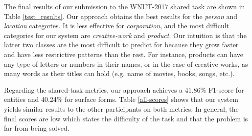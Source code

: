\documentclass[11pt,letterpaper]{article}
\begin{document}
\begin{table}
\caption{\small \label{test_results} This table shows the final results of our submission. The hardest class to predict for is \textit{creative-work}, while the easiest is \textit{person}.}
\end{table}

The final results of our submission to the WNUT-2017 shared task are shown in Table \ref{test_results}. Our approach obtains the best results for the \textit{person} and \textit{location} categories. It is less effective for \textit{corporation}, and the most difficult categories for our system are \textit{creative-work} and \textit{product}. Our intuition is that the latter two classes are the most difficult to predict for because they grow faster and have less restrictive patterns than the rest. For instance, products can have any type of letters or numbers in their names, or in the case of creative works, as many words as their titles can hold (e.g. name of movies, books, songs, etc.).

Regarding the shared-task metrics, our approach achieves a 41.86\% F1-score for entities and 40.24\% for surface forms. Table \ref{all-scores} shows that our system yields similar results to the other participants on both metrics. In general, the final scores are low which states the difficulty of the task and that the problem is far from being solved.
\end{document}
